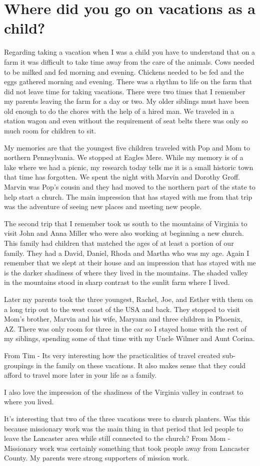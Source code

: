 \section{Where did you go on vacations as a child?}
Regarding taking a vacation when I was a child you have to understand that on a farm it was difficult to take time away from the care of the animals.
Cows needed to be milked and fed morning and evening.
Chickens needed to be fed and the eggs gathered morning and evening.
There was a rhythm to life on the farm that did not leave time for taking vacations.
There were two times that I remember my parents leaving the farm for a day or two.
My older siblings must have been old enough to do the chores with the help of a hired man.
We traveled in a station wagon and even without the requirement of seat belts there was only so much room for children to sit.

My memories are that the youngest five children traveled with Pop and Mom to northern Pennsylvania.
We stopped at Eagles Mere.
While my memory is of a lake where we had a picnic, my research today tells me it is a small historic town that time has forgotten.
We spent the night with Marvin and Dorothy Groff.
Marvin was Pop's cousin and they had moved to the northern part of the state to help start a church.
The main impression that has stayed with me from that trip was the adventure of seeing new places and meeting new people.

The second trip that I remember took us south to the mountains of Virginia to visit John and Anna Miller who were also working at beginning a new church.
This family had children that matched the ages of at least a portion of our family.
They had a David, Daniel, Rhoda and Martha who was my age.
Again I remember that we slept at their house and an impression that has stayed with me is the darker shadiness of where they lived in the mountains.
The shaded valley in the mountains stood in sharp contrast to the sunlit farm where I lived.

Later my parents took the three youngest, Rachel, Joe, and Esther with them on a long trip out to the west coast of the USA and back.
They stopped to visit Mom's brother, Marvin and his wife, Maryann and three children in Phoenix, AZ.
There was only room for three in the car so I stayed home with the rest of my siblings, spending some of that time with my Uncle Wilmer and Aunt Corina.

From Tim - Its very interesting how the practicalities of travel created sub-groupings in the family on these vacations.
It also makes sense that they could afford to travel more later in your life as a family.

I also love the impression of the shadiness of the Virginia valley in contrast to where you lived.

It's interesting that two of the three vacations were to church planters.
Was this because missionary work was the main thing in that period that led people to leave the Lancaster area while still connected to the church?
From Mom - Missionary work was certainly something that took people away from Lancaster County.
My parents were strong supporters of mission work.






